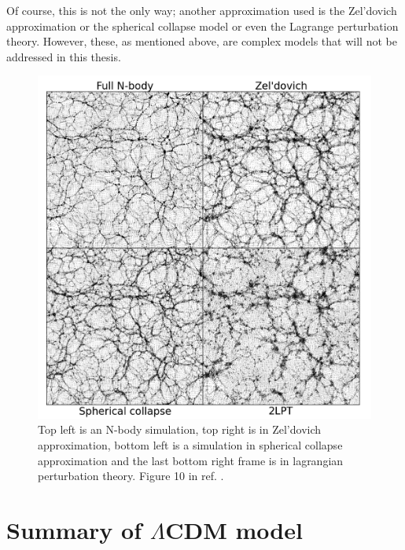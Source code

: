 Of course, this is not the only way; another approximation used is the Zel’dovich approximation or the spherical collapse model or even the Lagrange perturbation theory. However, these, as mentioned above, are complex models that will not be addressed in this thesis.

\begin{figure}[h!]
\centering
    \includegraphics[width=0.55\linewidth]{Images/Chapter1/Non linear simulation.png}
    \caption[Simulations in different regime]{Top left is an N-body simulation, top right is in Zel’dovich approximation, bottom left is a simulation in spherical collapse approximation and the last bottom right frame is in lagrangian perturbation theory. Figure 10 in ref. \cite{Neyrinck-2012}.}
\label{Non linear perturbation simulaion}
\end{figure}


\section{Summary of $\Lambda$CDM model}

